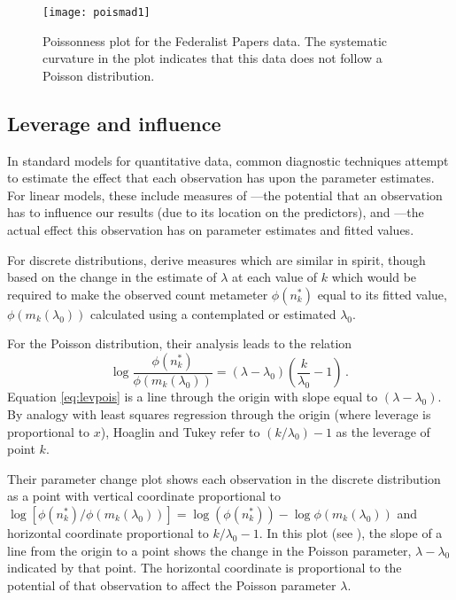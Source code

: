 \begin{figure}[htb]
  \centering
  \texttt{[image: poismad1]}
  \caption[Poissonness plot for the Federalist Papers data]{Poissonness plot for the Federalist Papers data.
The systematic curvature in the plot indicates that this data does not follow a Poisson distribution.}\label{fig:poismad1}

\end{figure}
\subsection{Leverage and influence}
In standard models for quantitative data, common diagnostic techniques
attempt to estimate the effect that each observation has upon the
parameter estimates.
For linear models, these include measures of
---the potential
that an observation has to influence our results (due to its location
on the predictors),
and ---the actual effect this observation has
on parameter estimates and fitted values.

For discrete distributions, \citet{HoaglinTukey:85} derive
measures which are similar in spirit,  though based on the change in
the estimate of $ \lambda$ at each value of $k$ which would be
required to make the observed count metameter $\phi(n_k^{*})$
equal to its fitted value,
$\phi(m_k(\lambda_0))$ calculated using a contemplated or estimated $ \lambda_0$.

For the Poisson distribution, their analysis leads to the relation
\begin{equation}\label{eq:levpois}
\log \frac{\phi(n_k^{*})}{\phi(m_k(\lambda_0))}
= ( \lambda - \lambda_0 ) \left( \frac{k}{\lambda_0} - 1 \right)
\period
\end{equation}
Equation \eqref{eq:levpois} is 
a line through the origin with slope equal to $( \lambda - \lambda_0 )$.
By analogy with least squares regression through the origin
(where leverage is proportional to $x$), Hoaglin and Tukey
refer to $(k/\lambda_0) - 1$ as the leverage of point $k$.

Their parameter change plot shows each observation in the discrete
distribution as a point with vertical coordinate proportional to
$ \log [ \phi(n_k^{*}) / \phi(m_k(\lambda_0)) ] =
  \log ( \phi(n_k^{*})) - \log \phi(m_k(\lambda_0))$
and horizontal coordinate proportional to $k/\lambda_0 - 1$.
In this plot (see ), the slope of
a line from the origin to a point shows the change in the Poisson
parameter, $\lambda - \lambda_0$ indicated by that
point.
The horizontal coordinate is proportional to the potential
of that observation to affect the Poisson parameter $\lambda$.

